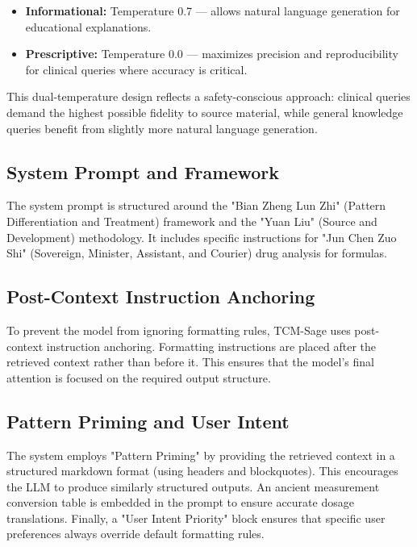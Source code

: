 \begin{itemize}
    \item \textbf{Informational:} Temperature 0.7 --- allows natural language generation for educational explanations.
    \item \textbf{Prescriptive:} Temperature 0.0 --- maximizes precision and reproducibility for clinical queries where accuracy is critical.
\end{itemize}

This dual-temperature design reflects a safety-conscious approach: clinical queries demand the highest possible fidelity to source material, while general knowledge queries benefit from slightly more natural language generation.

\subsection{System Prompt and Framework}

The system prompt is structured around the "Bian Zheng Lun Zhi" (Pattern Differentiation and Treatment) framework and the "Yuan Liu" (Source and Development) methodology. It includes specific instructions for "Jun Chen Zuo Shi" (Sovereign, Minister, Assistant, and Courier) drug analysis for formulas.

\subsection{Post-Context Instruction Anchoring}

To prevent the model from ignoring formatting rules, TCM-Sage uses post-context instruction anchoring. Formatting instructions are placed after the retrieved context rather than before it. This ensures that the model's final attention is focused on the required output structure.

\subsection{Pattern Priming and User Intent}

The system employs "Pattern Priming" by providing the retrieved context in a structured markdown format (using headers and blockquotes). This encourages the LLM to produce similarly structured outputs. An ancient measurement conversion table is embedded in the prompt to ensure accurate dosage translations. Finally, a "User Intent Priority" block ensures that specific user preferences always override default formatting rules.


